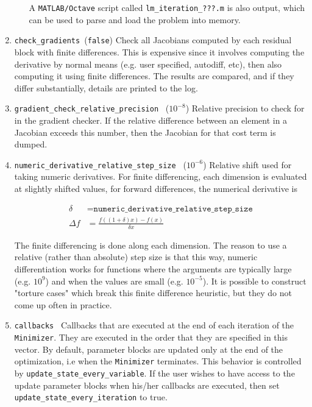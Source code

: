 \begin{enumerate}
\begin{itemize}
   A \texttt{MATLAB/Octave} script called \texttt{lm\_iteration\_???.m} is also output,
   which can be used to parse and load the problem into memory.
\end{itemize}



\item{\texttt{check\_gradients }}(\texttt{false})
 Check all Jacobians computed by each residual block with finite
     differences. This is expensive since it involves computing the
     derivative by normal means (e.g. user specified, autodiff,
     etc), then also computing it using finite differences. The
     results are compared, and if they differ substantially, details
     are printed to the log.

\item{\texttt{gradient\_check\_relative\_precision }} ($10^{-8}$)
  Relative precision to check for in the gradient checker. If the
  relative difference between an element in a Jacobian exceeds
  this number, then the Jacobian for that cost term is dumped.

\item{\texttt{numeric\_derivative\_relative\_step\_size }} ($10^{-6}$)
 Relative shift used for taking numeric derivatives. For finite
     differencing, each dimension is evaluated at slightly shifted
     values, \eg for forward differences, the numerical derivative is
  
\begin{align}
       \delta &= \texttt{numeric\_derivative\_relative\_step\_size}\\
       \Delta f &= \frac{f((1 + \delta)  x) - f(x)}{\delta x}
\end{align} 


     The finite differencing is done along each dimension. The
     reason to use a relative (rather than absolute) step size is
     that this way, numeric differentiation works for functions where
     the arguments are typically large (e.g. $10^9$) and when the
     values are small (e.g. $10^{-5}$). It is possible to construct
     "torture cases" which break this finite difference heuristic,
     but they do not come up often in practice.

\item{\texttt{callbacks }} 
  Callbacks that are executed at the end of each iteration of the
     \texttt{Minimizer}. They are executed in the order that they are
     specified in this vector. By default, parameter blocks are
     updated only at the end of the optimization, i.e when the
     \texttt{Minimizer} terminates. This behavior is controlled by
     \texttt{update\_state\_every\_variable}. If the user wishes to have access
     to the update parameter blocks when his/her callbacks are
     executed, then set \texttt{update\_state\_every\_iteration} to true.
    

\end{enumerate}
